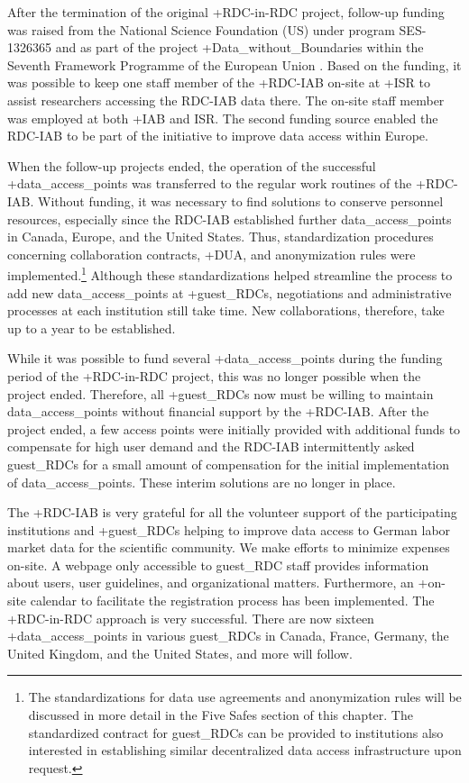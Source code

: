 \documentclass[
]{WileySix}
\begin{document}
After the termination of the original +RDC-in-RDC\textbar{} project, follow-up funding was raised from the National Science Foundation (US) under program SES-1326365 and as part of the project +Data\_without\_Boundaries\textbar{} within the Seventh Framework Programme of the European Union \citep{heining2012}. Based on the funding, it was possible to keep one staff member of the +RDC-IAB\textbar{} on-site at +ISR\textbar{} to assist researchers accessing the RDC-IAB data there. The on-site staff member was employed at both +IAB\textbar{} and ISR. The second funding source enabled the RDC-IAB to be part of the initiative to improve data access within Europe.

When the follow-up projects ended, the operation of the successful +data\_access\_points\textbar{} was transferred to the regular work routines of the +RDC-IAB\textbar. Without funding, it was necessary to find solutions to conserve personnel resources, especially since the RDC-IAB established further data\_access\_points in Canada, Europe, and the United States. Thus, standardization procedures concerning collaboration contracts, +DUA\textbar, and anonymization rules were implemented.\footnote{The standardizations for data use agreements and anonymization rules will be discussed in more detail in the Five Safes section of this chapter. The standardized contract for guest\_RDCs can be provided to institutions also interested in establishing similar decentralized data access infrastructure upon request.} Although these standardizations helped streamline the process to add new data\_access\_points at +guest\_RDC\textbar s, negotiations and administrative processes at each institution still take time. New collaborations, therefore, take up to a year to be established.

While it was possible to fund several +data\_access\_points\textbar{} during the funding period of the +RDC-in-RDC\textbar{} project, this was no longer possible when the project ended. Therefore, all +guest\_RDC\textbar s now must be willing to maintain data\_access\_points without financial support by the +RDC-IAB\textbar. After the project ended, a few access points were initially provided with additional funds to compensate for high user demand and the RDC-IAB intermittently asked guest\_RDCs for a small amount of compensation for the initial implementation of data\_access\_points. These interim solutions are no longer in place.

The +RDC-IAB\textbar{} is very grateful for all the volunteer support of the participating institutions and +guest\_RDC\textbar s helping to improve data access to German labor market data for the scientific community. We make efforts to minimize expenses on-site. A webpage only accessible to guest\_RDC staff provides information about users, user guidelines, and organizational matters. Furthermore, an +on-site\textbar{} calendar to facilitate the registration process has been implemented. The +RDC-in-RDC\textbar{} approach is very successful. There are now sixteen +data\_access\_points\textbar{} in various guest\_RDCs in Canada, France, Germany, the United Kingdom, and the United States, and more will follow.
\end{document}

